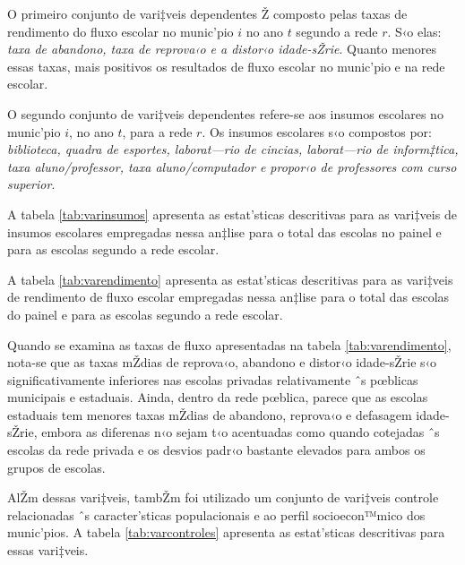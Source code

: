 \documentclass[a4paper, 12pt]{article}
\begin{document}
O primeiro conjunto de vari‡veis dependentes Ž composto pelas taxas de rendimento do fluxo escolar no munic’pio $i$ no ano $t$ segundo a rede $r$. S‹o elas:  \emph{taxa de abandono, taxa de reprova‹o e a distor‹o idade-sŽrie}. Quanto menores essas taxas, mais positivos os resultados de fluxo escolar no munic’pio e na rede escolar. 





O segundo conjunto de vari‡veis dependentes refere-se aos insumos escolares no munic’pio $i$, no ano $t$, para a rede $r$. Os insumos escolares s‹o compostos por: \emph{biblioteca, quadra de esportes, laborat—rio de cincias, laborat—rio de inform‡tica, taxa aluno/professor, taxa aluno/computador e propor‹o de professores com curso superior}.

A tabela \ref{tab:varinsumos} apresenta as estat’sticas descritivas para as vari‡veis de insumos escolares empregadas nessa an‡lise para o total das escolas no painel e para as escolas segundo a rede escolar. 

A tabela \ref{tab:varendimento} apresenta as estat’sticas descritivas para as vari‡veis de rendimento de fluxo escolar empregadas nessa an‡lise para o total das escolas do painel e para as escolas segundo a rede escolar. 






Quando se examina as taxas de fluxo apresentadas na  tabela  \ref{tab:varendimento}, nota-se que as taxas mŽdias de reprova‹o, abandono e distor‹o idade-sŽrie s‹o significativamente inferiores nas escolas privadas relativamente ˆs pœblicas municipais e estaduais. Ainda, dentro da rede pœblica, parece que as escolas estaduais tem menores taxas mŽdias de abandono, reprova‹o e defasagem idade-sŽrie, embora as diferenas n‹o sejam t‹o acentuadas como quando cotejadas ˆs escolas da rede privada e os desvios padr‹o bastante elevados para ambos os grupos de escolas.

AlŽm dessas vari‡veis, tambŽm foi utilizado um conjunto de vari‡veis controle relacionadas ˆs caracter’sticas populacionais e ao perfil socioecon™mico  dos munic’pios. A tabela \ref{tab:varcontroles} apresenta as estat’sticas descritivas para essas vari‡veis. 
\end{document}
